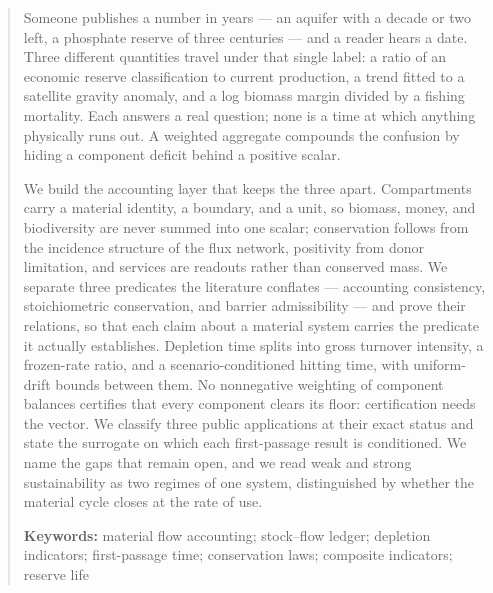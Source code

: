 
\begin{abstract}
Someone publishes a number in years --- an aquifer with a decade or two left, a
phosphate reserve of three centuries --- and a reader hears a date. Three
different quantities travel under that single label: a ratio of an economic
reserve classification to current production, a trend fitted to a satellite
gravity anomaly, and a log biomass margin divided by a fishing mortality. Each
answers a real question; none is a time at which anything physically runs out.
A weighted aggregate compounds the confusion by hiding a component deficit
behind a positive scalar.

We build the accounting layer that keeps the three apart. Compartments carry a
material identity, a boundary, and a unit, so biomass, money, and biodiversity
are never summed into one scalar; conservation follows from the incidence
structure of the flux network, positivity from donor limitation, and services
are readouts rather than conserved mass. We separate three predicates the
literature conflates --- accounting consistency, stoichiometric conservation,
and barrier admissibility --- and prove their relations, so that each claim about
a material system carries the predicate it actually establishes. Depletion time
splits into gross turnover intensity, a frozen-rate ratio, and a
scenario-conditioned hitting time, with uniform-drift bounds between them. No
nonnegative weighting of component balances certifies that every component
clears its floor: certification needs the vector. We classify three public
applications at their exact status and state the surrogate on which each
first-passage result is conditioned. We name the gaps that remain open, and we
read weak and strong sustainability as two regimes of one system, distinguished
by whether the material cycle closes at the rate of use.

\medskip
\noindent\textbf{Keywords:} material flow accounting; stock--flow ledger;
depletion indicators; first-passage time; conservation laws; composite
indicators; reserve life
\end{abstract}

